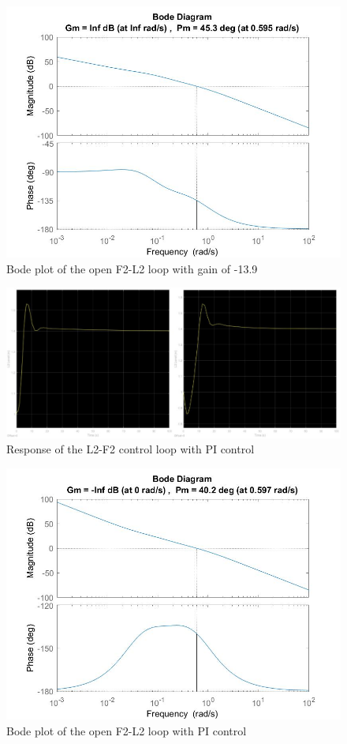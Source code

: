 \documentclass[11pt]{article}
\begin{document}
\begin{figure} [H]
\centering	\includegraphics[scale = 0.4]
{L2_139_bode}
\caption{Bode plot of the open F2-L2 loop with gain of -13.9}
\label{-13.9_bode}
\end{figure}

\begin{figure} [H]
\centering	\includegraphics[scale = 0.6]
{PI_set}
\caption{Response of the L2-F2 control loop with PI control}
\label{PI_set}
\end{figure}

\begin{figure} [H]
\centering	\includegraphics[scale = 0.4]
{L2_PI_Bode}
\caption{Bode plot of the open F2-L2 loop with PI control}
\label{PI_bode}
\end{figure}
\end{document}
